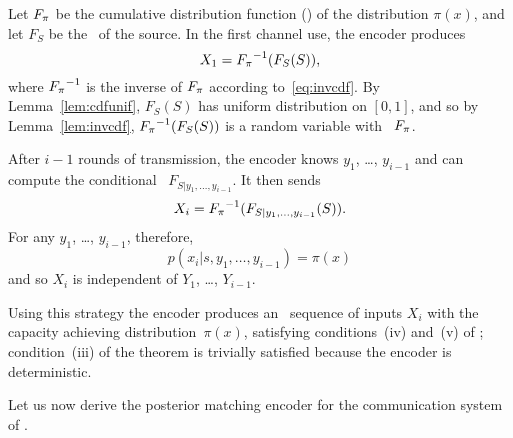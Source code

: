 Let ${F_{\pi}}$ be the cumulative distribution function (\cdf) of the distribution
$\pi(x)$, and let $F_S$ be the \cdf\ of the source. In the first channel
use, the encoder produces
\begin{equation}
  \label{eq:posteriorx1}
  X_1 = {F_{\pi}}^{-1}(F_S(S)),
\end{equation}
where ${F_{\pi}}^{-1}$ is the inverse of ${F_{\pi}}$ according to~\eqref{eq:invcdf}. By
Lemma~\ref{lem:cdfunif}, $F_S(S)$ has uniform distribution on $[0,1]$, and so by
Lemma~\ref{lem:invcdf}, ${F_{\pi}}^{-1}(F_S(S))$ is a random variable with \cdf\
${F_{\pi}}$.

After $i-1$ rounds of transmission, the encoder knows $y_1$, \ldots, $y_{i-1}$
and can compute the conditional
\cdf\ $F_{S|y_1, \ldots, y_{i-1}}$. It then sends
\begin{equation}
  \label{eq:posteriorxi}
  X_i = {F_{\pi}}^{-1}(F_{S|y_1,\dots,y_{i-1}}(S)).
\end{equation}
For any $y_1$, \ldots, $y_{i-1}$, therefore,
\begin{equation*}
  p(x_i|s, y_1, \dots, y_{i-1}) = \pi(x)
\end{equation*}
and so $X_i$ is independent of $Y_1$, \ldots, $Y_{i-1}$. 

Using this strategy the encoder produces an \iid\ sequence of inputs $X_i$
with the capacity achieving distribution~$\pi(x)$, satisfying conditions~(iv)
and~(v) of \thmref{tcntcfb}; condition~(iii) of the theorem is
trivially satisfied because the encoder is deterministic.

Let us now derive the posterior matching encoder for the communication system of
\exref{gaussfb}.

